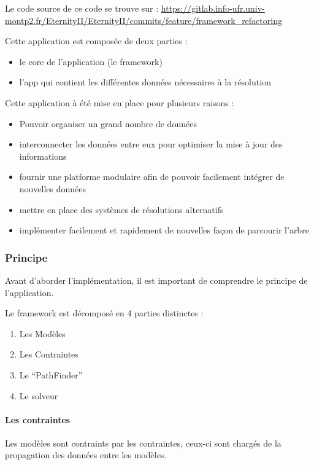 Le code source de ce code se trouve sur : \url{https://gitlab.info-ufr.univ-montp2.fr/EternityII/EternityII/commits/feature/framework_refactoring}

Cette application est composée de deux parties :

\begin{itemize}
	\item le core de l'application (le framework)
	\item l'app qui contient les différentes données nécessaires à la résolution
\end{itemize}

Cette application à été mise en place pour plusieurs raisons :
\begin{itemize}
	\item Pouvoir organiser un grand nombre de données
	\item interconnecter les données entre eux pour optimiser la mise à jour des informations
	\item fournir une platforme modulaire afin de pouvoir facilement intégrer de nouvelles données
	\item mettre en place des systèmes de résolutions alternatifs
	\item implémenter facilement et rapidement de nouvelles façon de parcourir l'arbre
\end{itemize}

\subsubsection{Principe}

Avant d'aborder l'implémentation, il est important de comprendre le principe de l'application.

Le framework est décomposé en 4 parties distinctes :

\begin{enumerate}
	\item Les Modèles
	\item Les Contraintes
	\item Le \enquote{PathFinder}
	\item Le solveur
\end{enumerate}


\paragraph{Les contraintes}

Les modèles sont contraints par les contraintes, ceux-ci sont chargés de la propagation des données entre les modèles.


